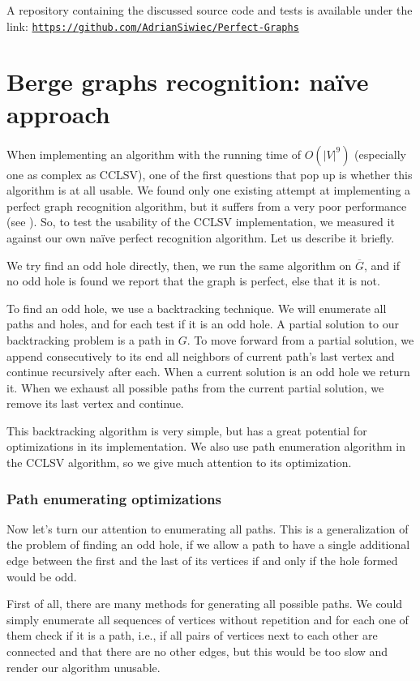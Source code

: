A repository containing the discussed source code and tests is available under the link: \href{https://github.com/AdrianSiwiec/Perfect-Graphs}{\texttt{https://github.com/AdrianSiwiec/Perfect-Graphs}}


\section{Berge graphs recognition: na\"ive approach}
\label{sec:secnaive}
When implementing an algorithm with the running time of $O(|V|^9)$ (especially one as complex as CCLSV), one of the first questions that pop up is whether this algorithm is at all usable. We found only one existing attempt at implementing a perfect graph recognition algorithm, but it suffers from a very poor performance (see ). So, to test the usability of the CCLSV implementation, we measured it against our own na\"ive perfect recognition algorithm. Let us describe it briefly.

We try find an odd hole directly, then, we run the same algorithm on $\overline{G}$, and if no odd hole is found we report that the graph is perfect, else that it is not.

To find an odd hole, we use a backtracking technique. We will enumerate all paths and holes, and for each test if it is an odd hole. A partial solution to our backtracking problem is a path in $G$. To move forward from a partial solution, we append consecutively to its end all neighbors of current path's last vertex and continue recursively after each. When a current solution is an odd hole we return it. When we exhaust all possible paths from the current partial solution, we remove its last vertex and continue.

This backtracking algorithm is very simple, but has a great potential for optimizations in its implementation. We also use path enumeration algorithm in the CCLSV algorithm, so we give much attention to its optimization.

\subsubsection{Path enumerating optimizations}
Now let's turn our attention to enumerating all paths. This is a generalization of the problem of finding an odd hole, if we allow a path to have a single additional edge between the first and the last of its vertices if and only if the hole formed would be odd.

First of all, there are many methods for generating all possible paths. We could simply enumerate all sequences of vertices without repetition and for each one of them check if it is a path, i.e., if all pairs of vertices next to each other are connected and that there are no other edges, but this would be too slow and render our algorithm unusable.

